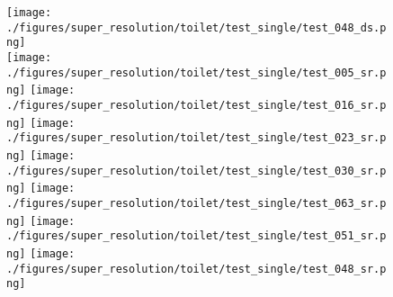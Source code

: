 \documentclass[10pt,twocolumn,letterpaper]{article}
\begin{document}
\begin{figure}
    \texttt{[image: ./figures/super\_resolution/toilet/test\_single/test\_048\_ds.png]}
   	\\
	\texttt{[image: ./figures/super\_resolution/toilet/test\_single/test\_005\_sr.png]}\hspace{-1.8mm}
	\texttt{[image: ./figures/super\_resolution/toilet/test\_single/test\_016\_sr.png]}\hspace{-1.1mm}
	\texttt{[image: ./figures/super\_resolution/toilet/test\_single/test\_023\_sr.png]}\hspace{-1.8mm}
	\texttt{[image: ./figures/super\_resolution/toilet/test\_single/test\_030\_sr.png]}\hspace{-1.8mm}
	\texttt{[image: ./figures/super\_resolution/toilet/test\_single/test\_063\_sr.png]}\hspace{-1.8mm}
	\texttt{[image: ./figures/super\_resolution/toilet/test\_single/test\_051\_sr.png]}\hspace{-2.2mm}
	\texttt{[image: ./figures/super\_resolution/toilet/test\_single/test\_048\_sr.png]}\\
	

\end{figure}
\end{document}
